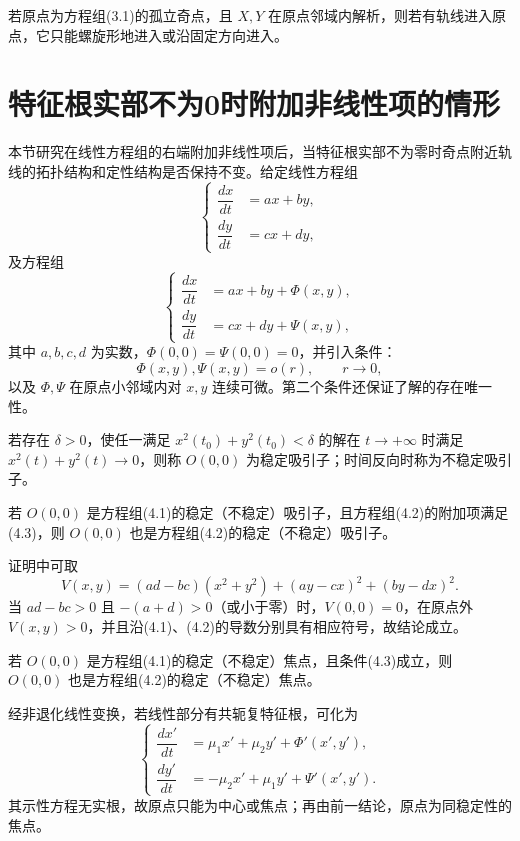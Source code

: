\begin{theorem}{}{}
若原点为方程组(3.1)的孤立奇点，且 $X,Y$ 在原点邻域内解析，则若有轨线进入原点，它只能螺旋形地进入或沿固定方向进入。
\end{theorem}

\section{特征根实部不为0时附加非线性项的情形}

本节研究在线性方程组的右端附加非线性项后，当特征根实部不为零时奇点附近轨线的拓扑结构和定性结构是否保持不变。给定线性方程组
\[
\left\{\begin{aligned}
\dfrac{dx}{dt}&=ax+by,\\
\dfrac{dy}{dt}&=cx+dy,
\end{aligned}\right.\tag{4.1}
\]
及方程组
\[
\left\{\begin{aligned}
\dfrac{dx}{dt}&=ax+by+\Phi(x,y),\\
\dfrac{dy}{dt}&=cx+dy+\Psi(x,y),
\end{aligned}\right.\tag{4.2}
\]
其中 $a,b,c,d$ 为实数，$\Phi(0,0)=\Psi(0,0)=0$，并引入条件：
\[
\Phi(x,y),\Psi(x,y)=o(r),\qquad r\to0,\tag{4.3}
\]
以及 $\Phi,\Psi$ 在原点小邻域内对 $x,y$ 连续可微。第二个条件还保证了解的存在唯一性。

\begin{definition}{}{}
若存在 $\delta>0$，使任一满足 $x^2(t_0)+y^2(t_0)<\delta$ 的解在 $t\to+\infty$ 时满足 $x^2(t)+y^2(t)\to0$，则称 $O(0,0)$ 为稳定吸引子；时间反向时称为不稳定吸引子。
\end{definition}

\begin{theorem}{}{}
若 $O(0,0)$ 是方程组(4.1)的稳定（不稳定）吸引子，且方程组(4.2)的附加项满足(4.3)，则 $O(0,0)$ 也是方程组(4.2)的稳定（不稳定）吸引子。
\end{theorem}

证明中可取
\[
V(x,y)=(ad-bc)(x^2+y^2)+(ay-cx)^2+(by-dx)^2.
\]
当 $ad-bc>0$ 且 $-(a+d)>0$（或小于零）时，$V(0,0)=0$，在原点外 $V(x,y)>0$，并且沿(4.1)、(4.2)的导数分别具有相应符号，故结论成立。

\begin{theorem}{}{}
若 $O(0,0)$ 是方程组(4.1)的稳定（不稳定）焦点，且条件(4.3)成立，则 $O(0,0)$ 也是方程组(4.2)的稳定（不稳定）焦点。
\end{theorem}

经非退化线性变换，若线性部分有共轭复特征根，可化为
\[
\left\{\begin{aligned}
\dfrac{dx'}{dt}&=\mu_1x'+\mu_2y'+\Phi'(x',y'),\\
\dfrac{dy'}{dt}&=-\mu_2x'+\mu_1y'+\Psi'(x',y').
\end{aligned}\right.\tag{4.4}
\]
其示性方程无实根，故原点只能为中心或焦点；再由前一结论，原点为同稳定性的焦点。


